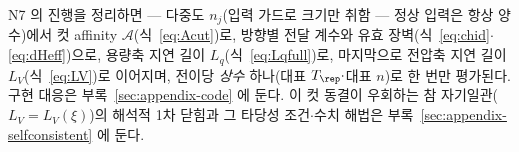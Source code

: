 N7 의 진행을 정리하면 --- 다중도 $n_j$(입력 가드로 크기만 취함 --- 정상 입력은 항상 양수)에서 컷 affinity $\mathcal A$(식~\eqref{eq:Acut})로,
방향별 전달 계수와 유효 장벽(식~\eqref{eq:chid}$\cdot$\eqref{eq:dHeff})으로, 용량축 지연 길이
$L_q$(식~\eqref{eq:Lqfull})로, 마지막으로 전압축 지연 길이 $L_V$(식~\eqref{eq:LV})로 이어지며, 전이당
\emph{상수} 하나(대표 $T_\rep\cdot$대표 $n$)로 한 번만 평가된다. 구현 대응은
부록~\ref{sec:appendix-code} 에 둔다. 이 컷 동결이 우회하는 참 자기일관($L_V=L_V(\xi)$)의 해석적 1차 닫힘과 그
타당성 조건$\cdot$수치 해법은 부록~\ref{sec:appendix-selfconsistent} 에 둔다.

